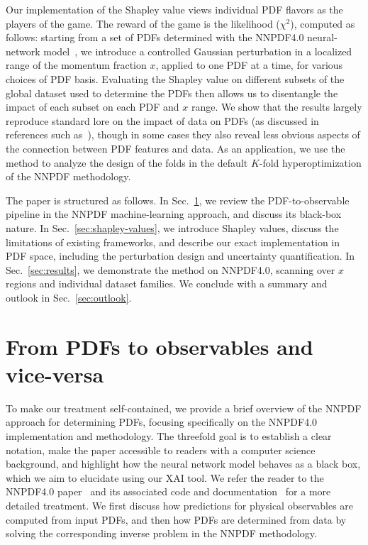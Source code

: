 \documentclass[11pt,a4paper]{article}
\begin{document}
Our implementation of the Shapley value views individual PDF flavors as the players of the game. 
The reward of the game is the likelihood ($\chi^2$), computed as follows: starting from a set of PDFs determined with the NNPDF4.0 neural-network model~\cite{NNPDF:2021njg}, we introduce a controlled Gaussian perturbation in a localized range of the momentum fraction $x$, applied to one PDF at a time, for various choices of PDF basis.
Evaluating the Shapley value on different subsets of the global dataset used to determine the PDFs then allows us to disentangle the impact of each subset on each PDF and $x$ range. 
We show that the results largely reproduce standard lore on the impact of data on PDFs (as discussed in references such as~\cite{Forte:2010dt,Gao:2017yyd}), though in some cases they also reveal less obvious aspects of the connection between PDF features and data. 
As an application, we use the method to analyze the design of the folds in the default $K$-fold hyperoptimization of the NNPDF methodology. 

The paper is structured as follows. In Sec.~\ref{sec:PDF-nutshell}, we review the PDF-to-observable pipeline in the NNPDF machine-learning approach, and discuss its black-box nature. 
In Sec.~\ref{sec:shapley-values}, we introduce Shapley values, discuss the limitations of existing frameworks, and describe our exact implementation in PDF space, including the perturbation design and uncertainty quantification. 
In Sec.~\ref{sec:results}, we demonstrate the method on NNPDF4.0, scanning over $x$ regions and individual dataset families. 
We conclude with a summary and outlook in Sec.~\ref{sec:outlook}.


\section{From PDFs to observables and vice-versa}
\label{sec:PDF-nutshell}

To make our treatment self-contained, we provide a brief overview of the NNPDF approach for determining PDFs, focusing specifically on the NNPDF4.0 implementation and methodology. The threefold goal is to establish a clear notation, make the paper accessible to readers with a computer science background, and highlight how the neural network model behaves as a black box, which we aim to elucidate using our XAI tool. We refer the reader to the NNPDF4.0 paper~\cite{NNPDF:2021njg} and its associated code and documentation~\cite{NNPDF:2021uiq} for a more detailed treatment. We first discuss how predictions for physical observables are computed from input PDFs, and then how PDFs are determined from data by solving the corresponding inverse problem in the NNPDF methodology.
\end{document}
